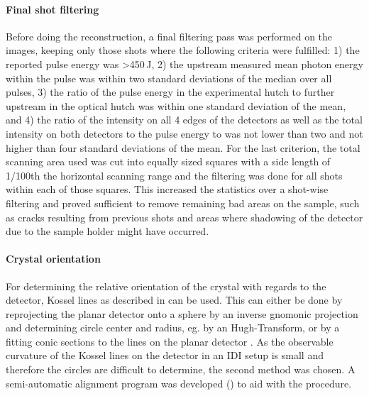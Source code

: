 \paragraph{Final shot filtering}
Before doing the reconstruction, a final filtering pass was performed on the images, keeping only those shots where the following criteria were fulfilled: 1)  the reported pulse energy was >450\,\textmu J, 2) the upstream measured mean photon energy within the pulse was within two standard deviations of the median over all pulses, 3) the ratio of the pulse energy in the experimental hutch to further upstream in the optical hutch was within one standard deviation of the mean, and 4) the ratio of the intensity on all 4 edges of the detectors as well as the total intensity on both detectors to the pulse energy to was not lower than two and not higher than four standard deviations of the mean.  For the last criterion, the total scanning area used was cut into equally sized squares with a side length of 1/100th the horizontal scanning range and the filtering was done for all shots within each of those squares. This increased the statistics over a shot-wise filtering and proved sufficient to remove remaining bad areas on the sample, such as cracks resulting from previous shots and areas where shadowing of the detector due to the sample holder might have occurred.










\paragraph{Crystal orientation}
For determining the relative orientation of the crystal with regards to the detector, Kossel lines as described in  can be used. This can either be done by reprojecting the planar detector onto a sphere by an inverse gnomonic projection and determining circle center and radius, eg. by an Hugh-Transform, or by a fitting conic sections to the lines on the planar detector \cite{morris1968,morawiec2016,faigel2016,herron2018}. As the observable curvature of the Kossel lines on the detector in an IDI setup is small and therefore the circles are difficult to determine, the second method was chosen. A semi-automatic alignment program was developed () to aid with the procedure.

